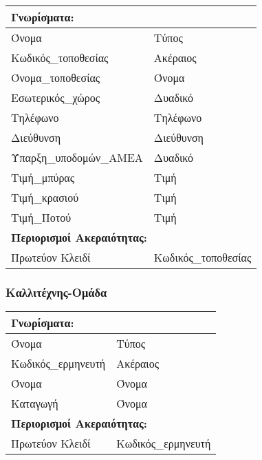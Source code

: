 \begin{tabular}{|p{6cm}|p{8cm}|}
  \multicolumn{2}{l}{\textbf{Γνωρίσματα:}}               \\ \hline
  Όνομα                  & Τύπος                         \\ \hline
  Κωδικός\_τοποθεσίας    & Ακέραιος                      \\ \hline
  Όνομα\_τοποθεσίας      & Όνομα                         \\ \hline
  Εσωτερικός\_χώρος      & Δυαδικό                       \\ \hline
  Τηλέφωνο               & Τηλέφωνο                      \\ \hline
  Διεύθυνση              & Διεύθυνση                     \\ \hline
  Ύπαρξη\_υποδομών\_ΑΜΕΑ & Δυαδικό                       \\ \hline
  Τιμή\_μπύρας           & Τιμή                          \\ \hline
  Τιμή\_κρασιού          & Τιμή                          \\ \hline
  Τιμή\_Ποτού            & Τιμή                          \\ \hline
  \multicolumn{2}{l}{\textbf{Περιορισμοί Ακεραιότητας:}} \\ \hline
  Πρωτεύον Κλειδί        & Κωδικός\_τοποθεσίας           \\ \hline
\end{tabular}


\subsubsection*{Καλλιτέχνης-Ομάδα}

\begin{tabular}{|p{6cm}|p{8cm}|}
  \multicolumn{2}{l}{\textbf{Γνωρίσματα:}}               \\ \hline
  Όνομα              & Τύπος                             \\ \hline
  Κωδικός\_ερμηνευτή & Ακέραιος                          \\ \hline
  Όνομα              & Όνομα                             \\ \hline
  Καταγωγή           & Όνομα                             \\ \hline
  \multicolumn{2}{l}{\textbf{Περιορισμοί Ακεραιότητας:}} \\ \hline
  Πρωτεύον Κλειδί    & Κωδικός\_ερμηνευτή                \\ \hline
\end{tabular}

